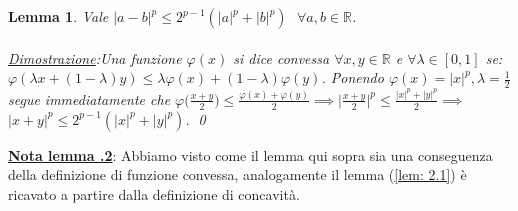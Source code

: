 \documentclass[a4paper,12pt]{report}
\newtheorem{lemma}{Lemma}[chapter]
\begin{document}
\newpage

\begin{lemma}\label{app: .2}
    Vale $|a-b|^p\leq 2^{p-1}(|a|^p+|b|^p) \  \ \ \forall a,b \in \mathbb{R} $.
    \\
    \\ \underline{Dimostrazione}:Una funzione $\varphi(x)$ si dice convessa $\forall x,y\in \mathbb{R}$ e $\forall \lambda \in [0,1]$ se:
    \\$\varphi(\lambda x+(1-\lambda)y)\leq\lambda\varphi(x)+(1-\lambda)\varphi(y)$.
    Ponendo $\varphi(x)=|x|^p, \lambda=\displaystyle\frac{1}{2}$ segue immediatamente che $\displaystyle\varphi\bigg(\frac{x+y}{2}\bigg)\leq\frac{\varphi(x)+\varphi(y)}{2}\implies \bigg|\frac{x+y}{2}\bigg|^p\leq \frac{|x|^p+|y|^p}{2}\implies $ 
    \\$|x+y|^p\leq2^{p-1}(|x|^p+|y|^p)$. \qed
\end{lemma}

\underline{\textbf{Nota lemma .2}}: Abbiamo visto come il lemma qui sopra sia una conseguenza della definizione di funzione convessa, analogamente il lemma (\ref{lem: 2.1}) è ricavato a partire dalla definizione di concavità.
\end{document}
